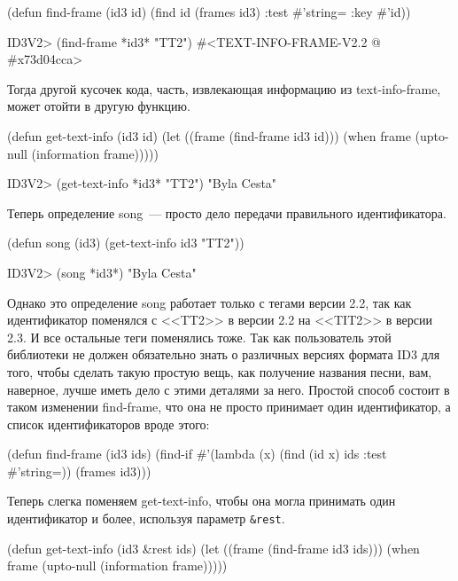\begin{myverb}
(defun find-frame (id3 id)
  (find id (frames id3) :test #'string= :key #'id))
\end{myverb}

\begin{myverb}
ID3V2> (find-frame *id3* "TT2")
#<TEXT-INFO-FRAME-V2.2 @ #x73d04cca>
\end{myverb}

Тогда другой кусочек кода, часть, извлекающая информацию из text-info-frame, может отойти
в другую функцию.

\begin{myverb}
(defun get-text-info (id3 id)
  (let ((frame (find-frame id3 id)))
    (when frame (upto-null (information frame)))))
\end{myverb}

\begin{myverb}
ID3V2> (get-text-info *id3* "TT2")
"Byla Cesta"
\end{myverb}

Теперь определение song~--- просто дело передачи правильного идентификатора.

\begin{myverb}
(defun song (id3) (get-text-info id3 "TT2"))
\end{myverb}

\begin{myverb}
ID3V2> (song *id3*)
"Byla Cesta"
\end{myverb}

Однако это определение song работает только с тегами версии 2.2, так как идентификатор
поменялся с <<TT2>> в версии 2.2 на <<TIT2>> в версии 2.3. И все остальные теги поменялись
тоже. Так как пользователь этой библиотеки не должен обязательно знать о различных
версиях формата ID3 для того, чтобы сделать такую простую вещь, как получение названия
песни, вам, наверное, лучше иметь дело с этими деталями за него. Простой способ состоит в
таком изменении find-frame, что она не просто принимает один идентификатор, а список
идентификаторов вроде этого:

\begin{myverb}
(defun find-frame (id3 ids)
  (find-if #'(lambda (x) (find (id x) ids :test #'string=)) (frames id3)))
\end{myverb}

Теперь слегка поменяем get-text-info, чтобы она могла принимать один идентификатор и
более, используя параметр \lstinline!&rest!.

\begin{myverb}
(defun get-text-info (id3 &rest ids)
  (let ((frame (find-frame id3 ids)))
    (when frame (upto-null (information frame)))))
\end{myverb}

